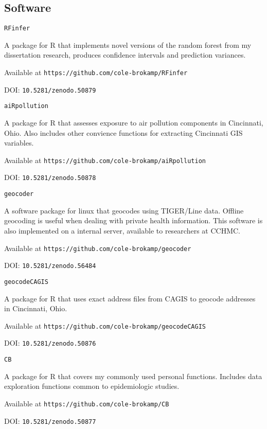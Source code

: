\documentclass[margin,line]{res}
\newenvironment{list1}{
  \begin{list}{\ding{113}}{%
      \setlength{\itemsep}{0in}
      \setlength{\parsep}{0in} \setlength{\parskip}{0in}
      \setlength{\topsep}{0in} \setlength{\partopsep}{0in} 
      \setlength{\leftmargin}{0.17in}}}{\end{list}}
\begin{document}
\begin{resume}
\section{\sc Software}

\texttt{RFinfer}
\begin{list1} \itemsep 2pt
\item[] A package for R that implements novel versions of the random forest from my dissertation research, produces confidence intervals and prediction variances.
\item[] Available at \texttt{https://github.com/cole-brokamp/RFinfer}
\item[] DOI: \texttt{10.5281/zenodo.50879}
\end{list1}

\texttt{aiRpollution}
\begin{list1} \itemsep 2pt
\item[] A package for R that assesses exposure to air pollution components in Cincinnati, Ohio.  Also includes other convience functions for extracting Cincinnati GIS variables.
\item[] Available at \texttt{https://github.com/cole-brokamp/aiRpollution}
\item[] DOI: \texttt{10.5281/zenodo.50878}
\end{list1}

\texttt{geocoder}
\begin{list1} \itemsep 2pt
\item[] A software package for linux that geocodes using TIGER/Line data.  Offline geocoding is useful when dealing with private health information. This software is also implemented on a internal server, available to researchers at CCHMC.
\item[] Available at \texttt{https://github.com/cole-brokamp/geocoder}
\item[] DOI: \texttt{10.5281/zenodo.56484}
\end{list1}

\texttt{geocodeCAGIS}
\begin{list1} \itemsep 2pt
\item[] A package for R that uses exact address files from CAGIS to geocode addresses in Cincinnati, Ohio.
\item[] Available at \texttt{https://github.com/cole-brokamp/geocodeCAGIS}
\item[] DOI: \texttt{10.5281/zenodo.50876}
\end{list1}

\texttt{CB}
\begin{list1} \itemsep 2pt
\item[] A package for R that covers my commonly used personal functions. Includes data exploration functions common to epidemiologic studies. 
\item[] Available at \texttt{https://github.com/cole-brokamp/CB}
\item[] DOI: \texttt{10.5281/zenodo.50877}
\end{list1}


\end{resume}
\end{document}
